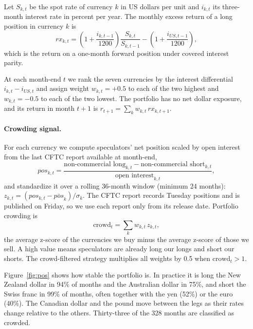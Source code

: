 \documentclass[11pt]{article}
\begin{document}
Let $S_{k,t}$ be the spot rate of currency $k$ in US dollars per unit and $i_{k,t}$ its three-month interest rate in percent per year. The monthly excess return of a long position in currency $k$ is
\begin{equation}
rx_{k,t} = \left(1+\frac{i_{k,t-1}}{1200}\right)\frac{S_{k,t}}{S_{k,t-1}} - \left(1+\frac{i_{US,t-1}}{1200}\right),
\end{equation}
which is the return on a one-month forward position under covered interest parity.

At each month-end $t$ we rank the seven currencies by the interest differential $i_{k,t}-i_{US,t}$ and assign weight $w_{k,t}=+0.5$ to each of the two highest and $w_{k,t}=-0.5$ to each of the two lowest. The portfolio has no net dollar exposure, and its return in month $t+1$ is $r_{t+1}=\sum_k w_{k,t}\,rx_{k,t+1}$.

\paragraph{Crowding signal.} For each currency we compute speculators' net position scaled by open interest from the last CFTC report available at month-end,
\begin{equation}
pos_{k,t} = \frac{\text{non-commercial long}_{k,t} - \text{non-commercial short}_{k,t}}{\text{open interest}_{k,t}},
\end{equation}
and standardize it over a rolling 36-month window (minimum 24 months): $z_{k,t} = (pos_{k,t}-\bar{pos}_{k})/\sigma_{k}$. The CFTC report records Tuesday positions and is published on Friday, so we use each report only from its release date. Portfolio crowding is
\begin{equation}
\text{crowd}_t = \sum_k w_{k,t}\, z_{k,t},
\end{equation}
the average z-score of the currencies we buy minus the average z-score of those we sell. A high value means speculators are already long our longs and short our shorts. The crowd-filtered strategy multiplies all weights by 0.5 when $\text{crowd}_t>1$.

Figure~\ref{fig:pos} shows how stable the portfolio is. In practice it is long the New Zealand dollar in 94\% of months and the Australian dollar in 75\%, and short the Swiss franc in 99\% of months, often together with the yen (52\%) or the euro (40\%). The Canadian dollar and the pound move between the legs as their rates change relative to the others. Thirty-three of the 328 months are classified as crowded.
\end{document}

